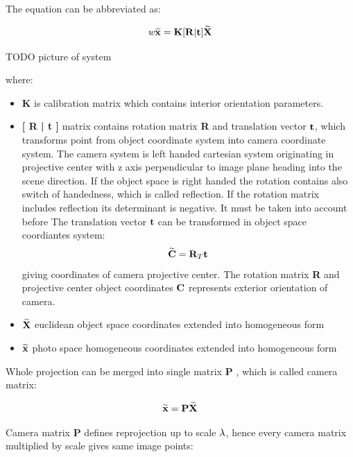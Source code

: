 \documentclass[a4paper,12pt]{article}
\newcommand{\ematr}[1]{
{\bf #1}
}
\newcommand{\evect}[1]{
{\bf #1}
}
\newcommand{\ehvect}[1]{
{\bf \widetilde{#1}}
}
\newcommand{\escal}[1]{
{\it #1}
}
\begin{document}
The equation can be abbreviated as:

\begin{equation}
\label{eq:p_exp}
\escal{w} \ehvect{x} = \ematr{K} \ematr{[}\ematr{R}|\evect{t}\ematr{]} \ehvect{X}
\end{equation}

TODO picture of system

where:

\begin{itemize}
\item \ematr{K} is calibration matrix which contains interior orientation parameters.  
\item \ematr{[\ematr{R}|\evect{t}]} matrix contains rotation matrix\ematr{R} and translation vector $\evect{t}$, 
	      which transforms point from object coordinate system 
	      into camera coordinate system. The camera system is left handed cartesian system originating in projective center 
	      with z axis perpendicular to image plane heading into the scene direction.
	      If the object space is right handed the rotation contains also switch of handedness,
	      which is called reflection. If the rotation matrix includes reflection its determinant is negative.
	      It must be taken into account before 
	      The translation vector $\evect{t}$ can  be transformed in object space coordiantes system:
	      \begin{equation}
	      \ehvect{C} = \ematr{R}_{T}\evect{t}
	      \end{equation}
	      giving coordinates of camera projective center. The rotation matrix \ematr{R} and projective 
	      center object coordinates $\evect{C}$
	      represents exterior orientation of camera.   
\item $\ehvect{X}$ euclidean object space coordinates extended into homogeneous form
\item $\ehvect{x}$ photo space homogeneous coordinates extended into homogeneous form
\end{itemize}

Whole projection can be merged into single matrix \ematr{P}, which is called camera matrix:

\begin{equation}
\label{eq:p_abbr}
\ehvect{x} = \ematr{P} \ehvect{X}
\end{equation}

Camera matrix \ematr{P} defines reprojection up to scale $\escal{\lambda}$, hence every camera matrix multiplied by scale gives same image points:
\end{document}
